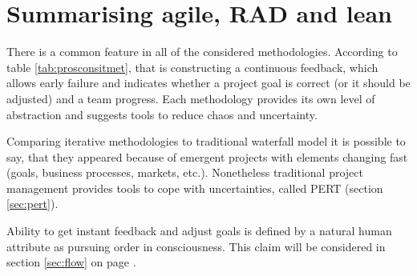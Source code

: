 \section{Summarising agile, RAD and lean}

There is a common feature in all of the considered methodologies. According to table \ref{tab:prosconsitmet}, that is constructing a continuous feedback, which allows early failure and indicates whether a project goal is correct (or it should be adjusted) and a team progress. Each methodology provides its own level of abstraction and suggests tools to reduce chaos and uncertainty.

Comparing iterative methodologies to traditional waterfall model it is possible to say, that they appeared because of emergent projects with elements changing fast (goals, business processes, markets, etc.). Nonetheless traditional project management provides tools to cope with uncertainties, called PERT (section \ref{sec:pert}).

Ability to get instant feedback and adjust goals is defined by a natural human attribute as pursuing order in consciousness. This claim will be considered in section \ref{sec:flow} on page \pageref{sec:flow}.

